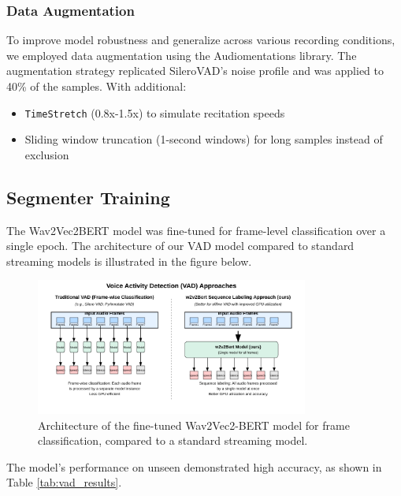\subsubsection{Data Augmentation}

To improve model robustness and generalize across various recording conditions, we employed data augmentation using the Audiomentations library. The augmentation strategy replicated SileroVAD's noise profile and was applied to 40\% of the samples. With additional:
\begin{itemize}
\item \texttt{TimeStretch} (0.8x-1.5x) to simulate recitation speeds
\item Sliding window truncation (1-second windows) for long samples instead of exclusion
\end{itemize}

\subsection{Segmenter Training}

The Wav2Vec2BERT model was fine-tuned for frame-level classification over a single epoch. The architecture of our VAD model compared to standard streaming models is illustrated in the figure below.

\begin{figure}[H]
\centering
\includegraphics[width=0.8\textwidth]{../figures/vad-arch.png}
\caption{Architecture of the fine-tuned Wav2Vec2-BERT model for frame classification, compared to a standard streaming model.}
\label{fig:vad_arch}
\end{figure}

The model's performance on unseen  demonstrated high accuracy, as shown in Table \ref{tab:vad_results}.

